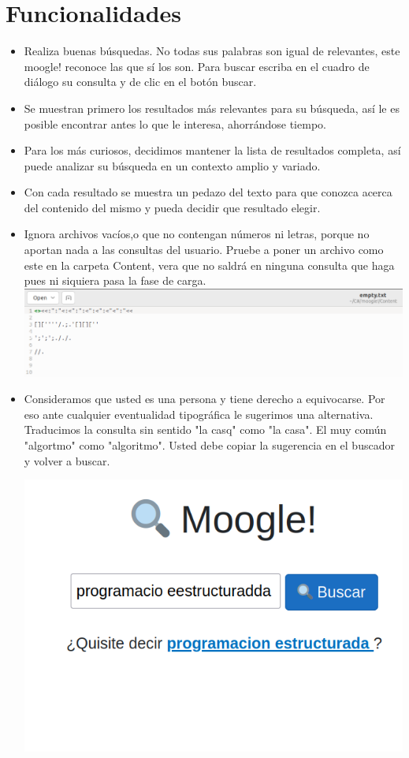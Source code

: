 \documentclass{article}
\begin{document}
\section{Funcionalidades}
\begin{itemize}
  \renewcommand{\labelitemi}{$\diamond$}
  \item Realiza buenas búsquedas. No todas sus palabras son igual de relevantes, este moogle! reconoce las que sí los son. Para buscar escriba en el cuadro de diálogo su consulta y de clic en el botón buscar.
  \item Se muestran primero los resultados más relevantes para su búsqueda, así le es posible encontrar antes lo que le interesa, ahorrándose tiempo.
  \item Para los más curiosos, decidimos mantener la lista de resultados completa, así puede analizar su búsqueda en un contexto amplio y variado.
  \item Con cada resultado se muestra un pedazo del texto para que conozca acerca del contenido del mismo y pueda decidir que resultado elegir.
  \item Ignora archivos vacíos,o que no contengan números ni letras, porque no aportan nada a las consultas del usuario. Pruebe a poner un archivo como este en la carpeta Content, vera que no saldrá en ninguna consulta que haga pues ni siquiera pasa la fase de carga.\\
  \includegraphics[scale=0.5]{Imagenes/Demostracion_de_Empty_._txt.png}
  \item Consideramos que usted es una persona y tiene derecho a equivocarse. Por eso ante cualquier eventualidad tipográfica le sugerimos una alternativa. Traducimos la consulta sin sentido "la casq" como "la casa". El muy común "algortmo" como "algoritmo". Usted debe copiar la sugerencia en el buscador y volver a buscar.
        \begin{center}
          \includegraphics[scale=0.25]{Imagenes/programacion_estructurada.png}\\

\end{center}
\end{itemize}
\end{document}
